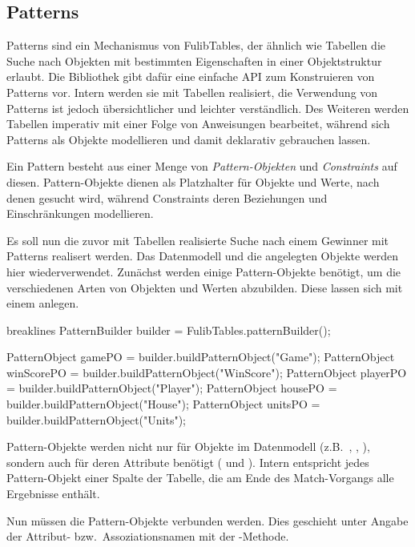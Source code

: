 \subsection{Patterns}\label{subsec:patterns}

Patterns sind ein Mechanismus von FulibTables, der ähnlich wie Tabellen die Suche nach Objekten mit bestimmten Eigenschaften in einer Objektstruktur erlaubt.
Die Bibliothek gibt dafür eine einfache API zum Konstruieren von Patterns vor.
Intern werden sie mit Tabellen realisiert, die Verwendung von Patterns ist jedoch übersichtlicher und leichter verständlich.
Des Weiteren werden Tabellen imperativ mit einer Folge von Anweisungen bearbeitet, während sich Patterns als Objekte modellieren und damit deklarativ gebrauchen lassen.

Ein Pattern besteht aus einer Menge von \emph{Pattern-Objekten} und \emph{Constraints} auf diesen.
Pattern-Objekte dienen als Platzhalter für Objekte und Werte, nach denen gesucht wird,
während Constraints deren Beziehungen und Einschränkungen modellieren.

Es soll nun die zuvor mit Tabellen realisierte Suche nach einem Gewinner mit Patterns realisert werden.
Das Datenmodell und die angelegten Objekte werden hier wiederverwendet.
Zunächst werden einige Pattern-Objekte benötigt, um die verschiedenen Arten von Objekten und Werten abzubilden.
Diese lassen sich mit einem  anlegen.

\begin{jcodeblock*}{breaklines}
    PatternBuilder builder = FulibTables.patternBuilder();

    PatternObject gamePO = builder.buildPatternObject("Game");
    PatternObject winScorePO = builder.buildPatternObject("WinScore");
    PatternObject playerPO = builder.buildPatternObject("Player");
    PatternObject housePO = builder.buildPatternObject("House");
    PatternObject unitsPO = builder.buildPatternObject("Units");
\end{jcodeblock*}

Pattern-Objekte werden nicht nur für Objekte im Datenmodell (z.B.\ , , ),
sondern auch für deren Attribute benötigt ( und ).
Intern entspricht jedes Pattern-Objekt einer Spalte der Tabelle, die am Ende des Match-Vorgangs alle Ergebnisse enthält.

Nun müssen die Pattern-Objekte verbunden werden.
Dies geschieht unter Angabe der Attribut- bzw.\ Assoziationsnamen mit der -Methode.

